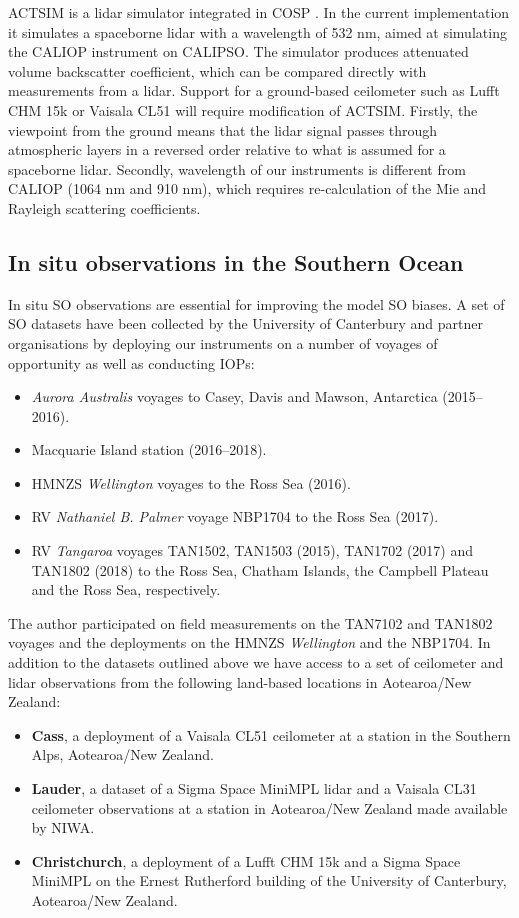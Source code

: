 ACTSIM is a lidar simulator integrated in COSP
\citep{chepfer2008,chiriaco2006}. In the current implementation it simulates a
spaceborne lidar with a wavelength of 532 nm, aimed at simulating the CALIOP
instrument on CALIPSO. The simulator produces attenuated volume backscatter
coefficient, which can be compared directly with measurements from a lidar.
Support for a ground-based ceilometer such as Lufft CHM 15k or Vaisala CL51
will require modification of ACTSIM. Firstly, the viewpoint from
the ground means that the lidar signal passes through atmospheric layers in a reversed
order relative to what is assumed for a spaceborne lidar. Secondly,
wavelength of our instruments is different from CALIOP (1064 nm and 910 nm),
which requires re-calculation of the Mie and Rayleigh scattering coefficients.

\subsection{In situ observations in the Southern Ocean}

In situ SO observations are essential for improving the model SO biases.
A set of SO datasets have been collected by the University of Canterbury
and partner organisations by deploying our instruments on a number
of voyages of opportunity as well as conducting IOPs:

\begin{itemize}
\item \textit{Aurora Australis} voyages to Casey, Davis and Mawson, Antarctica (2015--2016).
\item Macquarie Island station (2016--2018).
\item HMNZS \textit{Wellington} voyages to the Ross Sea (2016).
\item RV \textit{Nathaniel B. Palmer} voyage NBP1704 to the Ross Sea (2017).
\item RV \textit{Tangaroa} voyages TAN1502, TAN1503 (2015), TAN1702 (2017) and TAN1802 (2018)
to the Ross Sea, Chatham Islands, the Campbell Plateau and the Ross Sea, respectively.
\end{itemize}

\noindent
The author participated on field measurements on the TAN7102 and TAN1802 voyages and the deployments
on the HMNZS \textit{Wellington} and the NBP1704.
In addition to the datasets outlined above we have access to a set of
ceilometer and lidar observations from the following land-based locations in
Aotearoa/New Zealand:

\begin{itemize}
\item \textbf{Cass}, a deployment of a Vaisala CL51 ceilometer at a station in the
Southern Alps, Aotearoa/New Zealand.
\item \textbf{Lauder}, a dataset of a Sigma Space MiniMPL lidar and a Vaisala CL31
ceilometer observations at a station in Aotearoa/New Zealand made available by NIWA.
\item \textbf{Christchurch}, a deployment of a Lufft CHM 15k and a Sigma Space MiniMPL on the
Ernest Rutherford building of the University of Canterbury, Aotearoa/New
Zealand.
\end{itemize}

